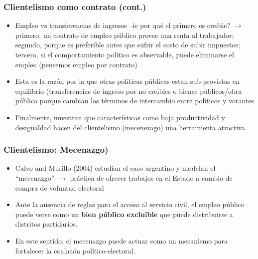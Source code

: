 \documentclass[handout,final,xcolor=dvipsnames]{beamer}
\begin{document}
   \begin{frame}\frametitle{Clientelismo como contrato (cont.)}
  \begin{itemize}\itemsep 10pt
      \item Empleo vs transferencias de ingresos --ie por qué el
        primero es creible? $\longrightarrow$
        primero, un contrato de empleo público provee una renta al
        trabajador; segundo, porque es preferible antes que sufrir el
        costo de subir impuestos; tercero, si el comportamiento
        político es observable, puede eliminarse el empleo (pensemos
        empleo por contrato)
        \item Esta es la razón por la que otras políticas públicas
          estan sub-provistas en equilibrio (transferencias de
          ingreso por no creibles o bienes públicos/obra pública
          porque cambian los términos de intercambio entre políticos y
          votantes
          \item Finalmente, muestran que características como baja
            productividad y desigualdad hacen del clientelismo
            (mecenezago) una herramienta atractiva. 
    \end{itemize}
  \end{frame}


  
  
  \begin{frame}\frametitle{Clientelismo: Mecenazgo)}
  \begin{itemize}\itemsep 10pt
      \item Calvo and Murillo (2004) estudian el caso argentino y
        modelan el ``mecenazgo'' $\longrightarrow$ práctica de ofrecer
        trabajos en el Estado a cambio de compra de voluntad electoral
        \item Ante la ausencia de reglas para el acceso al servicio
          civil, el empleo público puede verse como un \textbf{bien
            público excluible}  que puede distribuirse a distritos
          partidarios.
          \item En este sentido, el mecenazgo puede actuar como un
            mecanismo para fortalecer la coalición
            político-electoral. 
    \end{itemize}
  \end{frame}
\end{document}
